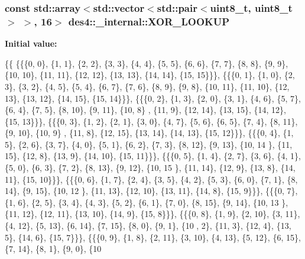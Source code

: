 \subsubsection[{\texorpdfstring{X\+O\+R\+\_\+\+L\+O\+O\+K\+UP}{XOR_LOOKUP}}]{\setlength{\rightskip}{0pt plus 5cm}const std\+::array$<$std\+::vector$<$std\+::pair$<$uint8\+\_\+t, uint8\+\_\+t$>$ $>$, 16$>$ des4\+::\+\_\+internal\+::\+X\+O\+R\+\_\+\+L\+O\+O\+K\+UP}\hypertarget{namespacedes4_1_1__internal_a6f0fa429678f3a6a8002d509714300fe}{}\label{namespacedes4_1_1__internal_a6f0fa429678f3a6a8002d509714300fe}
{\bfseries Initial value\+:}
\begin{DoxyCode}
\{\{
                \{\{\{0, 0\}, \{1, 1\}, \{2, 2\}, \{3, 3\}, \{4, 4\}, \{5, 5\}, \{6, 6\}, \{7, 7\}, \{8, 8\}, \{9, 9\}, \{10, 10\},
       \{11, 11\}, \{12, 12\}, \{13, 13\}, \{14, 14\}, \{15, 15\}\}\},
                \{\{\{0, 1\}, \{1, 0\}, \{2, 3\}, \{3, 2\}, \{4, 5\}, \{5, 4\}, \{6, 7\}, \{7, 6\}, \{8, 9\}, \{9, 8\}, \{10, 11\},
       \{11, 10\}, \{12, 13\}, \{13, 12\}, \{14, 15\}, \{15, 14\}\}\},
                \{\{\{0, 2\}, \{1, 3\}, \{2, 0\}, \{3, 1\}, \{4, 6\}, \{5, 7\}, \{6, 4\}, \{7, 5\}, \{8, 10\}, \{9, 11\}, \{10, 8\}
      , \{11, 9\}, \{12, 14\}, \{13, 15\}, \{14, 12\}, \{15, 13\}\}\},
                \{\{\{0, 3\}, \{1, 2\}, \{2, 1\}, \{3, 0\}, \{4, 7\}, \{5, 6\}, \{6, 5\}, \{7, 4\}, \{8, 11\}, \{9, 10\}, \{10, 9\}
      , \{11, 8\}, \{12, 15\}, \{13, 14\}, \{14, 13\}, \{15, 12\}\}\},
                \{\{\{0, 4\}, \{1, 5\}, \{2, 6\}, \{3, 7\}, \{4, 0\}, \{5, 1\}, \{6, 2\}, \{7, 3\}, \{8, 12\}, \{9, 13\}, \{10, 14
      \}, \{11, 15\}, \{12, 8\}, \{13, 9\}, \{14, 10\}, \{15, 11\}\}\},
                \{\{\{0, 5\}, \{1, 4\}, \{2, 7\}, \{3, 6\}, \{4, 1\}, \{5, 0\}, \{6, 3\}, \{7, 2\}, \{8, 13\}, \{9, 12\}, \{10, 15
      \}, \{11, 14\}, \{12, 9\}, \{13, 8\}, \{14, 11\}, \{15, 10\}\}\},
                \{\{\{0, 6\}, \{1, 7\}, \{2, 4\}, \{3, 5\}, \{4, 2\}, \{5, 3\}, \{6, 0\}, \{7, 1\}, \{8, 14\}, \{9, 15\}, \{10, 12
      \}, \{11, 13\}, \{12, 10\}, \{13, 11\}, \{14, 8\}, \{15, 9\}\}\},
                \{\{\{0, 7\}, \{1, 6\}, \{2, 5\}, \{3, 4\}, \{4, 3\}, \{5, 2\}, \{6, 1\}, \{7, 0\}, \{8, 15\}, \{9, 14\}, \{10, 13
      \}, \{11, 12\}, \{12, 11\}, \{13, 10\}, \{14, 9\}, \{15, 8\}\}\},
                \{\{\{0, 8\}, \{1, 9\}, \{2, 10\}, \{3, 11\}, \{4, 12\}, \{5, 13\}, \{6, 14\}, \{7, 15\}, \{8, 0\}, \{9, 1\}, \{10
      , 2\}, \{11, 3\}, \{12, 4\}, \{13, 5\}, \{14, 6\}, \{15, 7\}\}\},
                \{\{\{0, 9\}, \{1, 8\}, \{2, 11\}, \{3, 10\}, \{4, 13\}, \{5, 12\}, \{6, 15\}, \{7, 14\}, \{8, 1\}, \{9, 0\}, \{10

\end{DoxyCode}

